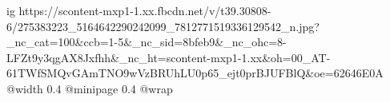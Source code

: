  
 
 
 
 

\ifcmt
  ig https://scontent-mxp1-1.xx.fbcdn.net/v/t39.30808-6/275383223_5164642290242099_7812771519336129542_n.jpg?_nc_cat=100&ccb=1-5&_nc_sid=8bfeb9&_nc_ohc=8-LFZt9y3qgAX8Jxfhh&_nc_ht=scontent-mxp1-1.xx&oh=00_AT-61TWfSMQvGAmTNO9wVzBRUhLU0p65_ejt0prBJUFBlQ&oe=62646E0A
  @width 0.4
  @minipage 0.4
  @wrap \parpic[r]
\fi

